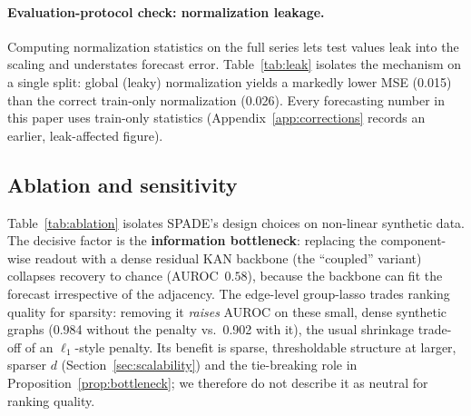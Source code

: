\paragraph{Evaluation-protocol check: normalization leakage.} Computing
normalization statistics on the full series lets test values leak into the
scaling and understates forecast error. Table~\ref{tab:leak} isolates the
mechanism on a single split: global (leaky) normalization yields a markedly
lower MSE (0.015) than the correct train-only normalization (0.026). Every
forecasting number in this paper uses train-only statistics
(Appendix~\ref{app:corrections} records an earlier, leak-affected figure).

\begin{table}[t]
\centering
\caption{Leak demonstration: identical SPADE model, single 80/20 split, global
(test-leaking) vs.\ train-only normalization. Leaking test statistics into the
scaler lowers the reported MSE, which is why all results use train-only
statistics.}
\label{tab:leak}
\end{table}

\subsection{Ablation and sensitivity}
\label{sec:ablation}

Table~\ref{tab:ablation} isolates SPADE's design choices on non-linear synthetic
data. The decisive factor is the \textbf{information bottleneck}: replacing the
component-wise readout with a dense residual KAN backbone (the ``coupled''
variant) collapses recovery to chance (AUROC~$0.58$), because the backbone can fit
the forecast irrespective of the adjacency. The edge-level group-lasso trades
ranking quality for sparsity: removing it \emph{raises} AUROC on these small,
dense synthetic graphs (0.984 without the penalty vs.\ 0.902 with it), the usual
shrinkage trade-off of an $\ell_1$-style penalty. Its benefit is sparse,
thresholdable structure at larger, sparser $d$
(Section~\ref{sec:scalability}) and the tie-breaking role in
Proposition~\ref{prop:bottleneck}; we therefore do not describe it as neutral
for ranking quality.

